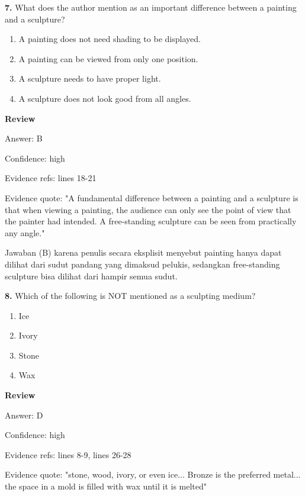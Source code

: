 \documentclass[12pt]{article}
\begin{document}
\endgroup
\par
\vspace{0.25\baselineskip}
\noindent\textbf{7.} What does the author mention as an important difference between a painting and a sculpture?
\begin{enumerate}[label=(\Alph*),leftmargin=*,itemsep=0.2em]
\item A painting does not need shading to be displayed.
\item A painting can be viewed from only one position.
\item A sculpture needs to have proper light.
\item A sculpture does not look good from all angles.
\end{enumerate}
\par
\begingroup
\setlength{\parskip}{0pt}
\setlength{\parindent}{0pt}
\textbf{Review}\par
Answer: B\par
Confidence: high\par
Evidence refs: lines 18-21\par
Evidence quote: "A fundamental difference between a painting and a sculpture is that when viewing a painting, the audience can only see the point of view that the painter had intended. A free-standing sculpture can be seen from practically any angle."\par
Jawaban (B) karena penulis secara eksplisit menyebut painting hanya dapat dilihat dari sudut pandang yang dimaksud pelukis, sedangkan free-standing sculpture bisa dilihat dari hampir semua sudut.\par
\endgroup
\par
\vspace{0.25\baselineskip}
\noindent\textbf{8.} Which of the following is NOT mentioned as a sculpting medium?
\begin{enumerate}[label=(\Alph*),leftmargin=*,itemsep=0.2em]
\item Ice
\item Ivory
\item Stone
\item Wax
\end{enumerate}
\par
\begingroup
\setlength{\parskip}{0pt}
\setlength{\parindent}{0pt}
\textbf{Review}\par
Answer: D\par
Confidence: high\par
Evidence refs: lines 8-9, lines 26-28\par
Evidence quote: "stone, wood, ivory, or even ice... Bronze is the preferred metal... the space in a mold is filled with wax until it is melted"\par
\end{document}
